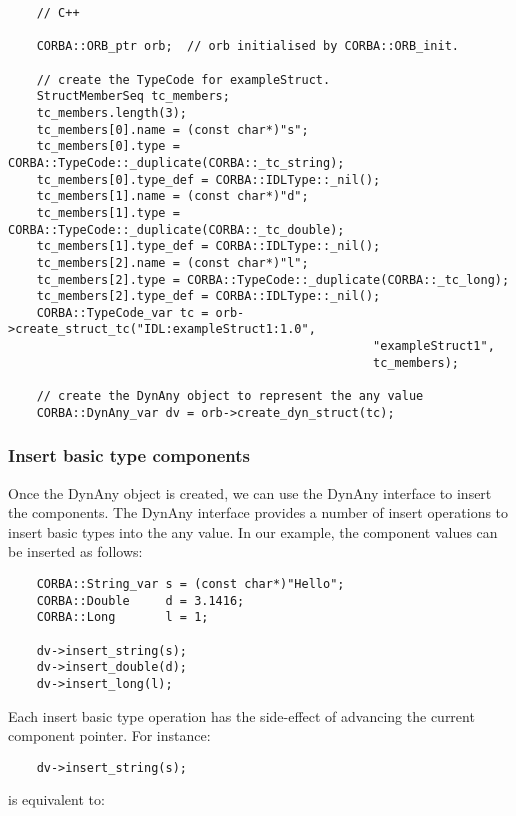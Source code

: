 \documentclass[11pt,twoside,onecolumn]{book}
\begin{document}
{\small
\begin{verbatim}
    // C++
    
    CORBA::ORB_ptr orb;  // orb initialised by CORBA::ORB_init.
    
    // create the TypeCode for exampleStruct.
    StructMemberSeq tc_members;
    tc_members.length(3);
    tc_members[0].name = (const char*)"s";
    tc_members[0].type = CORBA::TypeCode::_duplicate(CORBA::_tc_string);
    tc_members[0].type_def = CORBA::IDLType::_nil();
    tc_members[1].name = (const char*)"d";
    tc_members[1].type = CORBA::TypeCode::_duplicate(CORBA::_tc_double);
    tc_members[1].type_def = CORBA::IDLType::_nil();
    tc_members[2].name = (const char*)"l";
    tc_members[2].type = CORBA::TypeCode::_duplicate(CORBA::_tc_long);
    tc_members[2].type_def = CORBA::IDLType::_nil();
    CORBA::TypeCode_var tc = orb->create_struct_tc("IDL:exampleStruct1:1.0",
                                                   "exampleStruct1",
                                                   tc_members);
    
    // create the DynAny object to represent the any value
    CORBA::DynAny_var dv = orb->create_dyn_struct(tc);
\end{verbatim}
}

\subsubsection{Insert basic type components}

Once the DynAny object is created, we can use the DynAny interface to
insert the components. The DynAny interface provides a number of insert
operations to insert basic types into the any value. In our example, the
component values can be inserted as follows:

{\small
\begin{verbatim}
    CORBA::String_var s = (const char*)"Hello";
    CORBA::Double     d = 3.1416;
    CORBA::Long       l = 1;
    
    dv->insert_string(s);
    dv->insert_double(d);
    dv->insert_long(l);
\end{verbatim}
}

Each insert basic type operation has the side-effect of advancing the
current component pointer. For instance:

{\small
\begin{verbatim}
    dv->insert_string(s);
\end{verbatim}
}

is equivalent to:
\end{document}
